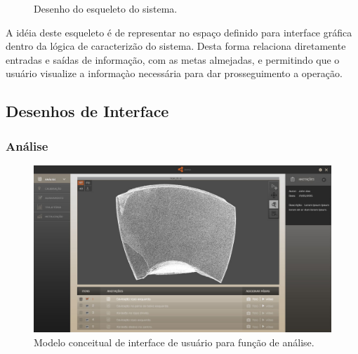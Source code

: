 \documentclass[12pt,a4paper]{article}
\begin{document}
\begin{figure}[H]
\begin{center}
  \caption{Desenho do esqueleto do sistema.}
  \label{fig:esqueleto_sistema}
\end{center}
\end{figure} 

A idéia deste esqueleto é de representar no espaço definido para interface
gráfica dentro da lógica de caracterizão do sistema. Desta forma relaciona
diretamente entradas e saídas de informação, com as metas almejadas, e
permitindo que o usuário visualize a informaçào necessária para dar
prosseguimento a operação.


\subsection {Desenhos de Interface}

\subsubsection {Análise}

\begin{figure}[H]
\begin{center}
  \includegraphics[width=.95\columnwidth]{figs/Analise.jpg}
  \caption{Modelo conceitual de interface de usuário para função de análise.}
  \label{fig:Interface_analise}
\end{center}
\end{figure} 
\end{document}
